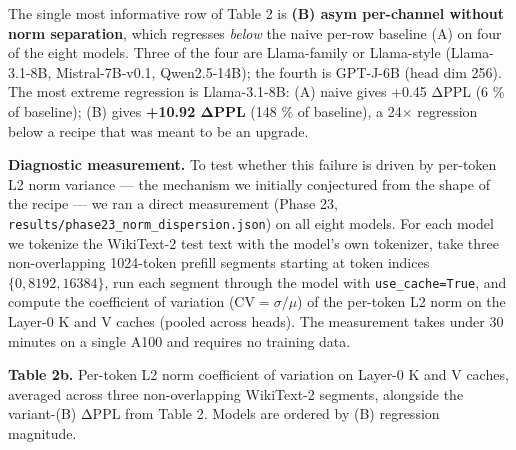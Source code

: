 \documentclass[
]{article}
\begin{document}
The single most informative row of Table 2 is \textbf{(B) asym
per-channel without norm separation}, which regresses \emph{below} the
naive per-row baseline (A) on four of the eight models. Three of the
four are Llama-family or Llama-style (Llama-3.1-8B, Mistral-7B-v0.1,
Qwen2.5-14B); the fourth is GPT-J-6B (head dim 256). The most extreme
regression is Llama-3.1-8B: (A) naive gives +0.45 ΔPPL (6 \% of
baseline); (B) gives \textbf{+10.92 ΔPPL} (148 \% of baseline), a 24×
regression below a recipe that was meant to be an upgrade.

\textbf{Diagnostic measurement.} To test whether this failure is driven
by per-token L2 norm variance --- the mechanism we initially conjectured
from the shape of the recipe --- we ran a direct measurement (Phase 23,
\texttt{results/phase23\_norm\_dispersion.json}) on all eight models.
For each model we tokenize the WikiText-2 test text with the model's own
tokenizer, take three non-overlapping 1024-token prefill segments
starting at token indices \(\{0, 8192, 16384\}\), run each segment
through the model with \texttt{use\_cache=True}, and compute the
coefficient of variation (\(\mathrm{CV} = \sigma / \mu\)) of the
per-token L2 norm on the Layer-0 K and V caches (pooled across heads).
The measurement takes under 30 minutes on a single A100 and requires no
training data.

\textbf{Table 2b.} Per-token L2 norm coefficient of variation on Layer-0
K and V caches, averaged across three non-overlapping WikiText-2
segments, alongside the variant-(B) ΔPPL from Table 2. Models are
ordered by (B) regression magnitude.
\end{document}
